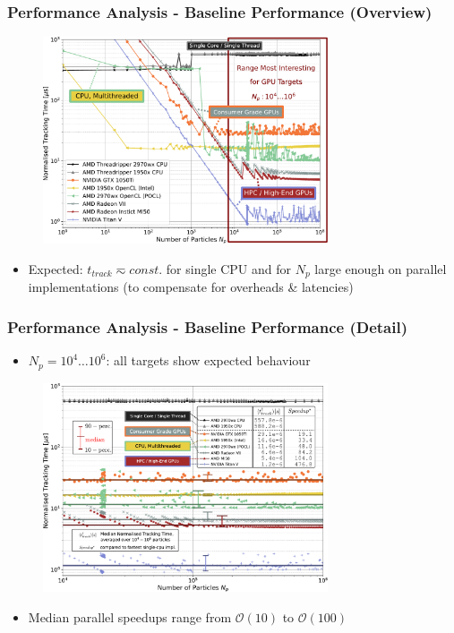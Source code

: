 \documentclass{beamer}
\begin{document}
\begin{frame}
    \frametitle{Performance Analysis - Baseline Performance (Overview)}
    \begin{figure}[H]
        \centering
        \includegraphics[width=0.75\textwidth]{poster_images/fig_benchmark_baseline_overview}
    \end{figure}
    \begin{itemize}
        \item {\color{MyDarkBlue}Expected:} $t_{track} \eqsim const.$ for single CPU and for $N_p$ large enough on parallel implementations (to compensate for overheads \& latencies)
    \end{itemize}
\end{frame}

\begin{frame}
    \frametitle{Performance Analysis - Baseline Performance (Detail)}
    \begin{itemize}
        \item $N_p = 10^4 \ldots 10^6$: all targets show expected behaviour
    \end{itemize}
    \begin{figure}[H]
        \centering
        \includegraphics[width=0.75\textwidth]{poster_images/fig_benchmark_baseline_detail}
    \end{figure}
    \begin{itemize}
        \item Median parallel {\color{MyDarkBlue}speedups} range from $\mathcal{O}(10)$ to $\mathcal{O}(100)$
    \end{itemize}
\end{frame}
\end{document}
